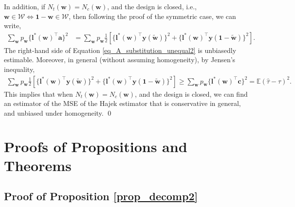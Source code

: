 \documentclass[12pt]{article}
\newcommand{\E}{{\mathbb{E}}}
\begin{document}
In addition, if $N_t(\bm{w}) = N_c(\bm{w})$, and the design is closed, i.e., $\bm{w} \in \mathcal{W} \iff \bm{1} - \bm{w} \in \mathcal{W}$, then following the proof of the symmetric case, we can write,
\begin{align}
   \sum_{\bm{w}} p_{\bm{w}} \{\bm{l}^*(\bm{w})^\top\bm{a}\}^2 & = \sum_{\bm{w}}p_{\bm{w}}\frac{1}{2}\left[\{\bm{l}^*(\bm{w})^\top \bm{y}(\tilde{\bm{w}})\}^2 + \{\bm{l}^*(\bm{w})^\top \bm{y}(\bm{1} - \tilde{\bm{w}})\}^2 \right]. \label{eq_A_substitution_unequal2} 
\end{align}
The right-hand side of Equation \ref{eq_A_substitution_unequal2} is unbiasedly estimable. Moreover, in general (without assuming homogeneity), by Jensen's inequality, 
\begin{align}
    \sum_{\bm{w}}p_{\bm{w}}\frac{1}{2}\left[\{\bm{l}^*(\bm{w})^\top \bm{y}(\tilde{\bm{w}})\}^2 + \{\bm{l}^*(\bm{w})^\top \bm{y}(\bm{1} - \tilde{\bm{w}})\}^2 \right] \geq \sum_{\bm{w}} p_{\bm{w}} \{\bm{l}^*(\bm{w})^\top\bm{c}\}^2 = \E(\hat{\tau}-\tau)^2.
\end{align}
This implies that when $N_t(\bm{w}) = N_c(\bm{w})$, and the design is closed, we can find an estimator of the MSE of the Hajek estimator that
is conservative in general, and unbiased under homogeneity.
\qed


\section{Proofs of Propositions and Theorems}


\subsection{Proof of Proposition \ref{prop_decomp2}}
\end{document}
